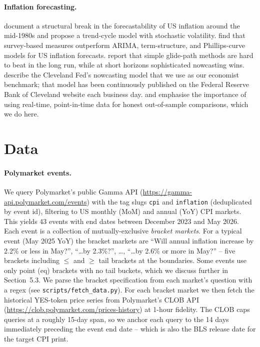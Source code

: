 \documentclass{article}
\begin{document}
\paragraph{Inflation forecasting.}
\citet{stockwatson2007inflation} document a structural break in the
forecastability of US inflation around the mid-1980s and propose a
trend-cycle model with stochastic volatility.
\citet{ang2007macro} find that survey-based measures outperform
ARIMA, term-structure, and Phillips-curve models for US inflation
forecasts.  \citet{faust2013forecasting} report that simple
glide-path methods are hard to beat in the long run, while at short
horizons sophisticated nowcasting wins.  \citet{knotek2017nowcasting}
describe the Cleveland Fed's nowcasting model that we use as our
economist benchmark; that model has been continuously published on the
Federal Reserve Bank of Cleveland website each business day.
\citet{croushore2001realtime} and \citet{faust2005news} emphasise the
importance of using real-time, point-in-time data for honest
out-of-sample comparisons, which we do here.

\section{Data}

\paragraph{Polymarket events.}  We query Polymarket's public Gamma API
(\url{https://gamma-api.polymarket.com/events}) with the tag slugs
\texttt{cpi} and \texttt{inflation} (deduplicated by event id),
filtering to US monthly (MoM) and annual (YoY) CPI markets.  This
yields 43 events with end dates between December 2023 and May 2026.
Each event is a collection of mutually-exclusive
\emph{bracket markets}.  For a typical event (May 2025 YoY) the
bracket markets are ``Will annual inflation increase by 2.2\% or less
in May?'', ``\ldots by 2.3\%?'', \ldots,
``\ldots by 2.6\% or more in May?'' -- five brackets including
$\le$ and $\ge$ tail brackets at the boundaries.  Some events use
only point (\textsf{eq}) brackets with no tail buckets, which we
discuss further in Section~5.3.  We parse the bracket
specification from each market's question with a regex (see
\texttt{scripts/fetch\_data.py}).  For each bracket market we then fetch
the historical YES-token price series from Polymarket's CLOB API
(\url{https://clob.polymarket.com/prices-history}) at 1-hour fidelity.
The CLOB caps queries at a roughly 15-day span, so we anchor each query
to the 14 days immediately preceding the event end date -- which is
also the BLS release date for the target CPI print.
\end{document}
